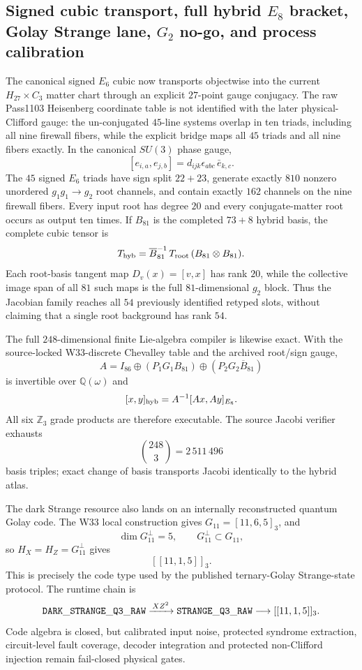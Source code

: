 \subsection*{Signed cubic transport, full hybrid $E_8$ bracket, Golay Strange lane, $G_2$ no-go, and process calibration}

The canonical signed $E_6$ cubic now transports objectwise into the current
$H_{27}\times C_3$ matter chart through an explicit $27$-point gauge
conjugacy.  The raw Pass1103 Heisenberg coordinate table is not identified
with the later physical-Clifford gauge: the un-conjugated $45$-line systems
overlap in ten triads, including all nine firewall fibers, while the explicit
bridge maps all $45$ triads and all nine fibers exactly.  In the canonical $SU(3)$ phase gauge,
\[
 [e_{i,a},e_{j,b}]=d_{ijk}\epsilon_{abc}\,\bar e_{k,c}.
\]
The $45$ signed $E_6$ triads have sign split $22+23$, generate exactly $810$
nonzero unordered $g_1g_1\to g_2$ root channels, and contain exactly $162$
channels on the nine firewall fibers.  Every input root has degree $20$ and
every conjugate-matter root occurs as output ten times.  If $B_{81}$ is the
completed $73+8$ hybrid basis, the complete cubic tensor is
\[
 T_{\rm hyb}=\overline B_{81}^{-1}\,T_{\rm root}\,
             (B_{81}\otimes B_{81}).
\]
Each root-basis tangent map $D_v(x)=[v,x]$ has rank $20$, while the collective
image span of all $81$ such maps is the full $81$-dimensional $g_2$ block.
Thus the Jacobian family reaches all $54$ previously identified retyped slots,
without claiming that a single root background has rank $54$.

The full $248$-dimensional finite Lie-algebra compiler is likewise exact.  With
the source-locked W33-discrete Chevalley table and the archived root/sign gauge,
\[
 A=I_{86}\oplus(P_1G_1B_{81})
          \oplus(P_2G_2\overline B_{81})
\]
is invertible over $\mathbb Q(\omega)$ and
\[
 [x,y]_{\rm hyb}=A^{-1}[Ax,Ay]_{E_8}.
\]
All six $\mathbb Z_3$ grade products are therefore executable.  The source
Jacobi verifier exhausts
\[
 \binom{248}{3}=2\,511\,496
\]
basis triples; exact change of basis transports Jacobi identically to the
hybrid atlas.

The dark Strange resource also lands on an internally reconstructed quantum
Golay code.  The W33 local construction gives $G_{11}=[11,6,5]_3$, and
\[
 \dim G_{11}^{\perp}=5,\qquad
 G_{11}^{\perp}\subset G_{11},
\]
so $H_X=H_Z=G_{11}^{\perp}$ gives
\[
 \boxed{[[11,1,5]]_3}.
\]
This is precisely the code type used by the published ternary-Golay
Strange-state protocol.  The runtime chain is
\[
 {\tt DARK\_STRANGE\_Q3\_RAW}
 \xrightarrow{\,XZ^2\,}
 {\tt STRANGE\_Q3\_RAW}
 \longrightarrow [[11,1,5]]_3 .
\]
Code algebra is closed, but calibrated input noise, protected syndrome
extraction, circuit-level fault coverage, decoder integration and protected
non-Clifford injection remain fail-closed physical gates.

